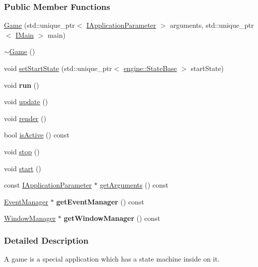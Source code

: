 \subsubsection*{Public Member Functions}
\begin{DoxyCompactItemize}
\item 
\hyperlink{a00038_a9b20c295fd6af60e00709da9ff9cde89}{Game} (std\+::unique\+\_\+ptr$<$ \hyperlink{a00043}{I\+Application\+Parameter} $>$ arguments, std\+::unique\+\_\+ptr$<$ \hyperlink{a00045}{I\+Main} $>$ main)
\item 
\hyperlink{a00038_a36ee1fe045159234e2916e20f0d94562}{$\sim$\+Game} ()
\item 
void \hyperlink{a00038_a395e9435f60c020fb7687f23e4ebca3a}{set\+Start\+State} (std\+::unique\+\_\+ptr$<$ \hyperlink{a00072}{engine\+::\+State\+Base} $>$ start\+State)
\item 
void {\bfseries run} ()\hypertarget{a00002_a6d9c94380f1451664ff6d09c314671c7}{}\label{a00002_a6d9c94380f1451664ff6d09c314671c7}

\item 
void \hyperlink{a00002_a149822f20163e98d41728f4752d7a7f7}{update} ()
\item 
void \hyperlink{a00002_af3ef70b1c3e25be0dbe68c460ec2db98}{render} ()
\item 
bool \hyperlink{a00002_a86f249cf621c4255df1a60987c588961}{is\+Active} () const 
\item 
void \hyperlink{a00002_aeb61beceae055e7681b6791dd5dddafa}{stop} ()
\item 
void \hyperlink{a00002_a9b8b10fd48e93db0986df610523105dc}{start} ()
\item 
const \hyperlink{a00043}{I\+Application\+Parameter} $\ast$ \hyperlink{a00002_af165b483b86469ff9db2f689f1212f14}{get\+Arguments} () const 
\item 
\hyperlink{a00034}{Event\+Manager} $\ast$ {\bfseries get\+Event\+Manager} () const \hypertarget{a00002_aa895c5c2a56efe782cd9cb038075bb60}{}\label{a00002_aa895c5c2a56efe782cd9cb038075bb60}

\item 
\hyperlink{a00087}{Window\+Manager} $\ast$ {\bfseries get\+Window\+Manager} () const \hypertarget{a00002_aed35eca596bce4c089aa3db72d3dc5b6}{}\label{a00002_aed35eca596bce4c089aa3db72d3dc5b6}

\end{DoxyCompactItemize}


\subsubsection{Detailed Description}
A game is a special application which has a state machine inside on it. 

